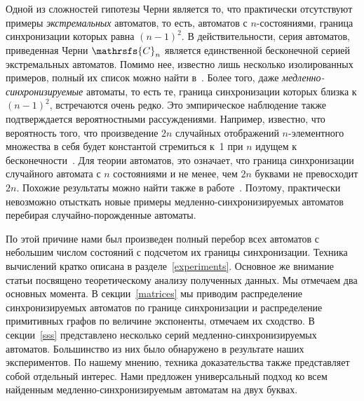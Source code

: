 \documentclass[11pt]{article}
\newcommand{\sa}{synchronizing automata}
\newcommand{\rl}{reset length}
\begin{document}
Одной из сложностей гипотезы Черни является то, что практически отсутствуют примеры
\emph{экстремальных} автоматов, то есть, автоматов с $n$-состояниями,
граница синхронизации которых равна $(n-1)^2$. В действительности, серия автоматов,
приведенная Черни $\mathrsfs{C}_n$ является единственной бесконечной серией экстремальных
автоматов. Помимо нее, известно лишь несколько изолированных примеров, полный их список
можно найти в~\cite{Vo08}. Более того, даже \emph{медленно-синхронизируемые} автоматы, 
то есть те, граница синхронизации которых близка к $(n - 1)^2$, встречаются очень редко.
Это эмпирическое наблюдение также подтверждается вероятностными рассуждениями.
Например, известно, что вероятность того, что произведение $2n$ случайных отображений
$n$-элементного множества в себя будет константой стремиться к~1 при $n$ 
идущем к бесконечности~\cite{Hi88}. Для теории автоматов, это означает, что граница
синхронизации случайного автомата с $n$ состояниями и не менее, чем 
$2n$ буквами не превосходит $2n$. Похожие результаты можно найти также в работе~\cite{SZ}. 
Поэтому, практически невозможно отысткать новые примеры медленно-синхронизируемых автоматов
перебирая случайно-порожденные автоматы.



По этой причине нами был произведен полный перебор всех автоматов с небольшим
числом состояний с подсчетом их границы синхронизации. Техника вычислений кратко
описана в разделе~\ref{experiments}. Основное же внимание статьи посвящено
теоретическому анализу полученных данных. Мы отмечаем два основных момента.
В секции~\ref{matrices} мы приводим распределение синхронизируемых автоматов
по границе синхронизации и распределение примитивных графов по величине
экспоненты, отмечаем их сходство.
В секции~\ref{sss} представлено несколько серий медленно-синхронизируемых автоматов.
Большинство из них было обнаружено в результате наших экспериментов.
По нашему мнению, техника доказательства также представляет собой отдельный интерес.
Нами предложен универсальный подход ко всем найденным медленно-синхронизируемым автоматам на
двух буквах.
\end{document}
